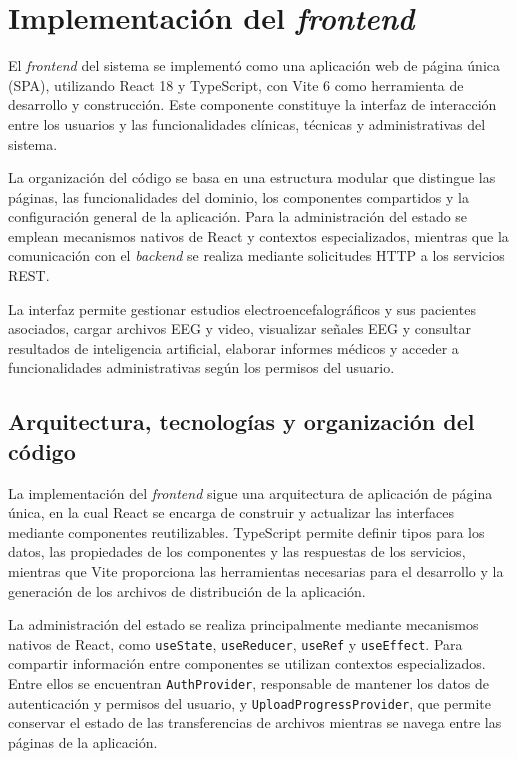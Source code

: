 \section{Implementación del \textit{frontend}}

El \textit{frontend} del sistema se implementó como una
aplicación web de página única (SPA), utilizando
React 18 y TypeScript, con Vite 6 como herramienta
de desarrollo y construcción. Este componente
constituye la interfaz de interacción entre los
usuarios y las funcionalidades clínicas, técnicas
y administrativas del sistema.

La organización del código se basa en una
estructura modular que distingue las páginas,
las funcionalidades del dominio, los componentes
compartidos y la configuración general de la
aplicación. Para la administración del estado
se emplean mecanismos nativos de React y
contextos especializados, mientras que la
comunicación con el \textit{backend} se realiza mediante
solicitudes HTTP a los servicios REST.

La interfaz permite gestionar estudios
electroencefalográficos y sus pacientes
asociados, cargar archivos EEG y video,
visualizar señales EEG y consultar resultados de inteligencia artificial, elaborar informes médicos y
acceder a funcionalidades administrativas
según los permisos del usuario.

\subsection{Arquitectura, tecnologías y organización del código}

La implementación del \textit{frontend} sigue una arquitectura
de aplicación de página única, en la cual React se
encarga de construir y actualizar las interfaces
mediante componentes reutilizables. TypeScript
permite definir tipos para los datos, las propiedades
de los componentes y las respuestas de los servicios,
mientras que Vite proporciona las herramientas
necesarias para el desarrollo y la generación de
los archivos de distribución de la aplicación.

La administración del estado se realiza principalmente
mediante mecanismos nativos de React, como
\texttt{useState}, \texttt{useReducer},
\texttt{useRef} y \texttt{useEffect}.
Para compartir información entre componentes
se utilizan contextos especializados.
Entre ellos se encuentran \texttt{AuthProvider},
responsable de mantener los datos de autenticación
y permisos del usuario, y
\texttt{UploadProgressProvider}, que permite
conservar el estado de las transferencias de
archivos mientras se navega entre las páginas
de la aplicación.


